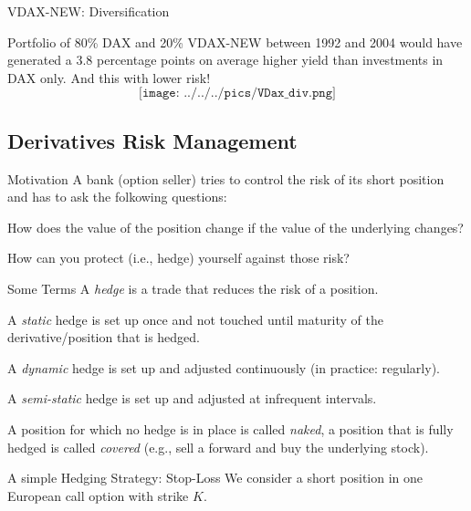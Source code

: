 
{VDAX-NEW: Diversification}


	Portfolio of 80\% DAX and 20\% VDAX-NEW between
1992 and 2004 would have generated a 3.8 percentage
points on average higher yield than investments in
DAX only. And this with lower risk!
$$\texttt{[image: ../../../pics/VDax\_div.png]}$$


\subsection{Derivatives Risk Management}


{Motivation}
A bank (option seller) tries to control the risk of its short position and has to ask the folkowing questions:


	How does the value of the position change if the value of the underlying changes?

	How can you protect (i.e., hedge) yourself against those risk?


{Some Terms}
A \emph{hedge} is a trade that reduces the risk of a position.


	A \emph{static} hedge is set up once and not touched until maturity of
  the derivative/position that is hedged.

	A \emph{dynamic} hedge is set up and adjusted continuously (in practice:
  regularly).

	A \emph{semi-static} hedge is set up and adjusted at infrequent
  intervals.


A position for which no hedge is in place is called \emph{naked}, a position
that is fully hedged is called \emph{covered} (e.g., sell a forward and buy the
underlying stock).

{A simple Hedging Strategy: Stop-Loss}
We consider a short position in one European call option with strike $K$.


